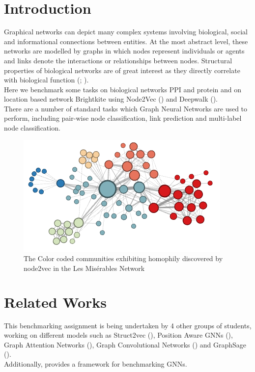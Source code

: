 \documentclass[sigconf]{acmart}
\begin{document}
\section{Introduction}
Graphical networks can depict many complex systems involving biological, social and informational connections between entities. At the most abstract level, these networks are modelled by graphs in which nodes represent individuals or agents and links denote the interactions or relationships between nodes. Structural properties of biological networks are of great interest as they directly correlate with biological function (\citet{qi2006modularity}; \citet{wuchty2003evolutionary}). \\
Here we benchmark some tasks on biological networks PPI and protein and on location based network Brightkite using Node2Vec (\citet{node2vec-kdd2016}) and Deepwalk (\citet{Perozzi:2014:DOL:2623330.2623732}). \\
There are a number of standard tasks which Graph Neural Networks are used to perform, including pair-wise node classification, link prediction and multi-label node classification.

\begin{figure}[h!]
  \includegraphics[width=0.85\linewidth]{homo.png}
  \caption{The Color coded communities exhibiting homophily discovered by node2vec in the Les Misérables Network \cite{node2vec-kdd2016}}
  \label{fig:boat1}
\end{figure}

\section{Related Works}

This benchmarking assignment is being undertaken by 4 other groups of students, working on different models such as Struct2vec (\cite{ribeiro2017struc2vec}), Position Aware GNNs (\cite{you2019position}),  Graph Attention Networks (\cite{velivckovic2017graph}), Graph Convolutional Networks (\cite{kipf2016semi}) and GraphSage (\cite{hamilton2017inductive}). \\
Additionally, \citet{dwivedi2020benchmarking} provides a framework for benchmarking GNNs.
\end{document}
